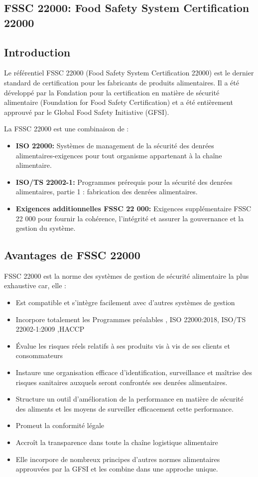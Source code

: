 \begin{spacing}{1.2}
\section{FSSC 22000: Food Safety System Certification 22000}
\subsection*{Introduction}
Le référentiel FSSC 22000 (Food Safety System Certification 22000) est le dernier standard de certification  pour les fabricants de produits alimentaires. Il a été développé par la Fondation pour la certification en matière de sécurité alimentaire (Foundation for Food Safety Certification) et a été entièrement approuvé par le Global Food Safety Initiative (GFSI).


La FSSC 22000 est une combinaison de :
\begin{itemize}
	\item \textbf{ISO 22000:} Systèmes de management de la sécurité des denrées alimentaires-exigences pour tout organisme appartenant à la chaîne alimentaire.
	\item \textbf{ISO/TS 22002-1:} Programmes prérequis pour la sécurité des denrées alimentaires, partie 1 : fabrication des denrées alimentaires.
	\item \textbf{Exigences additionnelles FSSC 22 000:} Exigences supplémentaire FSSC 22 000 pour fournir la cohérence, l’intégrité et assurer la gouvernance et la gestion du système.
\end{itemize}

\subsection{Avantages de FSSC 22000}
FSSC 22000 est la norme des systèmes de gestion de sécurité alimentaire la plus exhaustive car, elle :


\begin{itemize}
	\item Est compatible et s'intègre facilement avec d’autres systèmes de gestion
	\item Incorpore totalement les Programmes préalables , ISO 22000:2018, ISO/TS  22002-1:2009 ,HACCP
	\item Évalue les risques réels relatifs à ses produits vis à vis de ses clients et consommateurs
	\item Instaure une organisation efficace d’identification, surveillance et maîtrise des risques sanitaires auxquels seront confrontés ses denrées alimentaires.
	\item Structure un outil d’amélioration de la performance en matière de sécurité des aliments et les moyens de surveiller efficacement cette performance.
	\item Promeut la conformité légale
	\item Accroît la transparence dans toute la chaîne logistique alimentaire
	\item Elle incorpore de nombreux principes d’autres normes alimentaires
      approuvées par la GFSI et les combine dans une approche unique.
\end{itemize}

\end{spacing}
